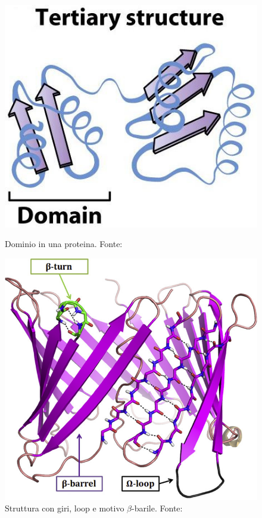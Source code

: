 {\begin{figure}[!htb]
	\centering
	\includegraphics[scale=0.4]{images/dominio.jpg}
	\caption{Dominio in una proteina. Fonte: \cite{moran2012principles}}
	\label{fig:domini}
	\endminipage\hfill
	\centering
	\includegraphics[scale=1]{images/turn-loop.jpg}
	\caption{Struttura con giri, loop e motivo $\beta$-barile. Fonte: \cite{MURRAY2017477}}
	\label{fig:turn-loops}
	\endminipage\hfill
\end{figure}

}
